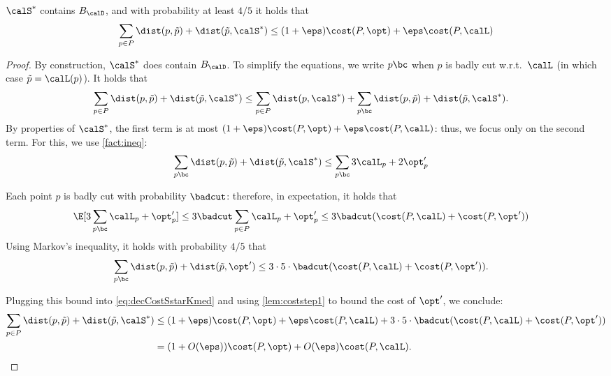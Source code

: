 \begin{lemma}
  \label{prop:structkmedian}
  $ \calS^*$ contains $B_{\calD}$, and with probability at least $4/5$ it holds that 
  \[\sum_{p \in P}  \dist(p, \tilde p) + \dist(\tilde p,  \calS^*) \leq (1+\eps)\cost(P, \opt) + \eps \cost(P, \calL)\]
\end{lemma}
\begin{proof}
By construction, $ \calS^*$ does contain $B_\calD$.
To simplify the equations, we write $p \bc$ when $p$ is badly cut w.r.t.\ $\calL$ (in which case $\tilde p = \calL(p)$). It holds that 
\begin{align}
\label{eq:decCostSstarKmed}
    \sum_{p \in P} \dist(p, \tilde p) + \dist(\tilde p,  \calS^*) &\leq \sum_{p \in P} \dist( p,  \calS^*) + \sum_{p \bc} \dist(p, \tilde p) + \dist(\tilde p,  \calS^*).
\end{align}
By properties of $ \calS^*$, the first term is at most $(1+\eps)\cost(P, \opt) + \eps \cost(P, \calL)$: thus, we focus only on the second term.
For this, we use \cref{fact:ineq}:
\begin{align*}
    \sum_{p \bc} \dist(p, \tilde p) + \dist(\tilde p,  \calS^*) & \leq \sum_{p \bc} 3\calL_p + 2\opt'_p
\end{align*}

Each point $p$ is badly cut with probability $\badcut$: therefore, in expectation, it holds that 
\begin{align*}
    \E[3\sum_{p \bc}  \calL_p + \opt'_p] &\leq 3 \badcut \sum_{p \in P}\calL_p + \opt'_p \leq 3\badcut (\cost(P, \calL) + \cost(P,  \opt'))
\end{align*}
Using Markov's inequality, it holds with probability $4/5$ that 
\begin{align*}
    \sum_{p \bc}  \dist(p, \tilde p) + \dist(\tilde p,  \opt') &\leq 3\cdot 5 \cdot \badcut (\cost(P, \calL) + \cost(P,  \opt')).
\end{align*}

Plugging this bound into \cref{eq:decCostSstarKmed} and using \cref{lem:coststep1} to bound the cost of $\opt'$, we conclude:
\begin{align*}
    \sum_{p \in P} \dist(p, \tilde p) + \dist(\tilde p,  \calS^*) &\leq (1+\eps)\cost(P, \opt) + \eps \cost(P, \calL)  + 3\cdot 5 \cdot \badcut (\cost(P, \calL) + \cost(P,  \opt')) \\
    &= (1+O(\eps))\cost(P, \opt) + O(\eps)\cost(P, \calL).
\end{align*}
\end{proof}


